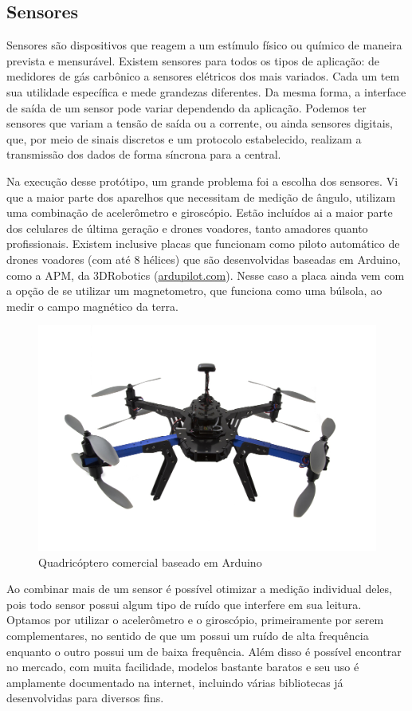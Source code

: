 \documentclass[a4paper,12pt]{article}
\begin{document}
\subsection{Sensores}
\label{sensores}

Sensores são dispositivos que reagem a um estímulo físico ou químico de maneira prevista e mensurável. Existem sensores para todos os tipos de aplicação: de medidores de gás carbônico a sensores elétricos dos mais variados. Cada um tem sua utilidade específica e mede grandezas diferentes. Da mesma forma, a interface de saída de um sensor pode variar dependendo da aplicação. Podemos ter sensores que variam a tensão de saída ou a corrente, ou ainda sensores digitais, que, por meio de sinais discretos e um protocolo estabelecido, realizam a transmissão dos dados de forma síncrona para a central.

Na execução desse protótipo, um grande problema foi a escolha dos sensores. Vi que a maior parte dos aparelhos que necessitam de medição de ângulo, utilizam uma combinação de acelerômetro e giroscópio. Estão incluídos ai a maior parte dos celulares de última geração e drones voadores, tanto amadores quanto profissionais. Existem inclusive placas que funcionam como piloto automático de drones voadores (com até 8 hélices) que são desenvolvidas baseadas em Arduino, como a APM, da 3DRobotics (\href{http://copter.ardupilot.com/wiki/common-apm25-and-26-overview/}{ardupilot.com}). Nesse caso a placa ainda vem com a opção de se utilizar um magnetometro, que funciona como uma búlsola, ao medir o campo magnético da terra.

\begin{figure}[H]
\centering
\includegraphics[width=.5\textwidth]{img/copter.jpg}
\caption{Quadricóptero comercial baseado em Arduino}
\end{figure}

Ao combinar mais de um sensor é possível otimizar a medição individual deles, pois todo sensor possui algum tipo de ruído que interfere em sua leitura. Optamos por utilizar o acelerômetro e o giroscópio, primeiramente por serem complementares, no sentido de que um possui um ruído de alta frequência enquanto o outro possui um de baixa frequência. Além disso é possível encontrar no mercado, com muita facilidade, modelos bastante baratos e seu uso é amplamente documentado na internet, incluindo várias bibliotecas já desenvolvidas para diversos fins.
\end{document}
